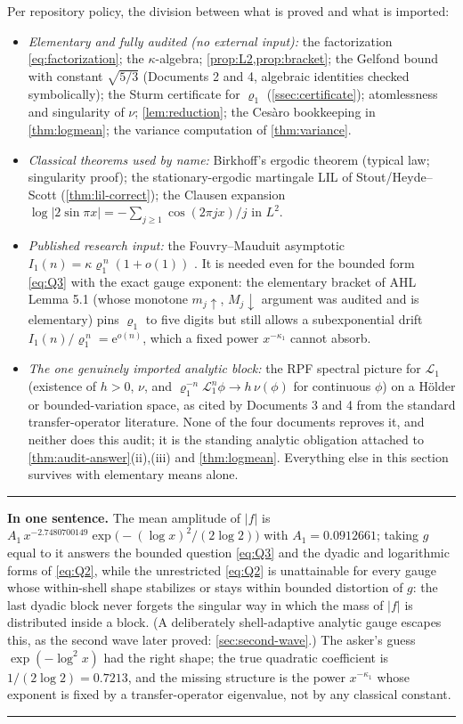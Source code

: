 \documentclass[11pt,oneside]{article}
\theoremstyle{definition}
\theoremstyle{remark}
\newcommand{\e}{\mathrm e}
\newcommand{\smallo}{o}
\newcommand{\Lop}{\mathcal L}
\newenvironment{boxedremark}{%
  \par\smallskip\noindent\begin{center}\begin{minipage}{0.94\textwidth}%
  \color{black}\hrule\vspace{0.6em}\small
}{%
  \vspace{0.6em}\hrule\end{minipage}\end{center}\smallskip
}
\begin{document}
Per repository policy, the division between what is proved and what is
imported:
\begin{itemize}
\item \emph{Elementary and fully audited (no external input):}
the factorization \eqref{eq:factorization}; the $\kappa$-algebra;
\cref{prop:L2,prop:bracket}; the Gelfond bound with constant
$\sqrt{5/3}$ (Documents 2 and 4, algebraic identities checked
symbolically); the Sturm certificate for $\varrho_1$
(\cref{ssec:certificate}); atomlessness and singularity of $\nu$;
\cref{lem:reduction}; the Ces\`aro bookkeeping in
\cref{thm:logmean}; the variance computation of \cref{thm:variance}.
\item \emph{Classical theorems used by name:}
Birkhoff's ergodic theorem (typical law; singularity proof); the
stationary-ergodic martingale LIL of Stout/Heyde--Scott
(\cref{thm:lil-correct}); the Clausen expansion
$\log|2\sin\pi x|=-\sum_{j\ge1}\cos(2\pi jx)/j$ in $L^2$.
\item \emph{Published research input:}
the Fouvry--Mauduit asymptotic
$I_1(n)=\kappa\varrho_1^{\,n}(1+\smallo(1))$
\cite{fouvrymauduit1996}.  It is needed even for the bounded form
\eqref{eq:Q3} with the exact gauge exponent: the elementary bracket of
AHL Lemma 5.1 (whose monotone $m_j\uparrow$, $M_j\downarrow$ argument was
audited and is elementary) pins $\varrho_1$ to five digits but still
allows a subexponential drift $I_1(n)/\varrho_1^{\,n}=\e^{\smallo(n)}$,
which a fixed power $x^{-\kappa_1}$ cannot absorb.
\item \emph{The one genuinely imported analytic block:}
the RPF spectral picture for $\Lop_1$ (existence of $h>0$, $\nu$, and
$\varrho_1^{-n}\Lop_1^n\phi\to h\,\nu(\phi)$ for continuous $\phi$) on a
H\"older or bounded-variation space, as cited by Documents 3 and 4 from
the standard transfer-operator literature.  None of the four documents
reproves it, and neither does this audit; it is the standing analytic
obligation attached to \cref{thm:audit-answer}(ii),(iii) and
\cref{thm:logmean}.  Everything else in this section survives with
elementary means alone.
\end{itemize}

\begin{boxedremark}
\textbf{In one sentence.}  The mean amplitude of $|f|$ is
$A_1\,x^{-2.7480700149}\exp\bigl(-(\log x)^2/(2\log2)\bigr)$ with
$A_1=0.0912661$; taking $g$ equal to it answers the bounded question
\eqref{eq:Q3} and the dyadic and logarithmic forms of \eqref{eq:Q2},
while the unrestricted \eqref{eq:Q2} is unattainable for every gauge
whose within-shell shape stabilizes or stays within bounded distortion
of $g$: the last dyadic block never forgets the singular way in which
the mass of $|f|$ is distributed inside a block.  (A deliberately
shell-adaptive analytic gauge escapes this, as the second wave later
proved: \cref{sec:second-wave}.)  The asker's guess
$\exp(-\log^2x)$ had the right shape; the true quadratic coefficient is
$1/(2\log2)=0.7213$, and the missing structure is the power
$x^{-\kappa_1}$ whose exponent is fixed by a transfer-operator
eigenvalue, not by any classical constant.
\end{boxedremark}
\end{document}
